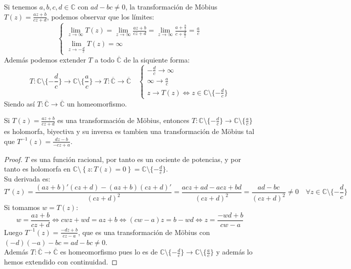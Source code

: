 \begin{observación}
    Si tenemos $a,b,c,d \in \mathbb{C}$ con $ad - bc \neq 0$, la transformación de Möbius $T(z) = \frac{az + b}{cz + d}$, podemos observar que los límites:
\[
\begin{cases}
    \lim_{z \to \infty} T(z) = 
    \lim_{z \to \infty} \frac{az + b}{cz + d} =
    \lim_{z \to \infty} \frac{a + \frac{b}{z}}{c + \frac{d}{z}} =
    \frac{a}{c}\\
    \lim_{z \to -\frac{d}{c}} T(z) = \infty
\end{cases}
\]
    Además podemos extender $T$ a todo $\overline{\mathbb{C}}$ de la siquiente forma:
\[
    T: \mathbb{C} \setminus \{-\frac{d}{c}\} \to \mathbb{C} \setminus \{\frac{a}{c}\} \longrightarrow
    T: \overline{\mathbb{C}} \to \overline{\mathbb{C}} \quad
    \begin{cases}
        -\frac{d}{c} \to \infty \\
        \infty \to \frac{a}{c} \\
        z \to T(z) \iff z \in \mathbb{C} \setminus \{-\frac{d}{c}\}
    \end{cases}
\]
Siendo así $T: \overline{\mathbb{C}} \to \overline{\mathbb{C}}$ un homeomorfismo.
\end{observación}



\begin{proposición}
    Si $T(z) = \frac{az + b}{cz + d}$ es una transformación de Möbius, entonces $T: \mathbb{C} \setminus \{-\frac{d}{c}\} \to \mathbb{C} \setminus \{\frac{a}{c}\}$ es holomorfa, biyectiva y su inversa es tambien una transformación de Möbius tal que $T^{-1}(z) = \frac{dz - b}{-cz + a}$.
\end{proposición}

\begin{proof}
    $T$ es una función racional, por tanto es un cociente de potencias, y por tanto es holomorfa en $\mathbb{C} \setminus \left\{ z : T(z) = 0 \right\} = \mathbb{C} \setminus \{-\frac{d}{c}\}$.\\
    Su derivada es:
    \[
        T'(z) = \frac{(az + b)'(cz + d) - (az + b)(cz + d)'}{(cz + d)^2} =
        \frac{acz + ad - acz + bd}{(cz + d)^2} =
        \frac{ad - bc}{(cz + d)^2} \neq 0 \quad \forall z \in \mathbb{C} \setminus \{-\frac{d}{c}\}
    \]
    Si tomamos $w = T(z)$:
    \[
    w = \frac{az + b}{cz + d} \iff
    cwz + wd = az + b \iff
    (cw - a)z = b - wd \iff
    z = \frac{-wd + b}{cw - a}
    \]
    Luego $T^{-1}(z) = \frac{-dz + b}{cz - a}$, que es una transformación de Möbius con $(-d)(-a) - b c = ad - bc \neq 0$.\\
    Además $T: \overline{\mathbb{C}} \to \overline{\mathbb{C}}$ es homeomorfismo pues lo es de $\mathbb{C} \setminus \{-\frac{d}{c}\} \to \mathbb{C} \setminus \{\frac{a}{c}\}$ y además lo hemos extendido con continuidad.
\end{proof}

